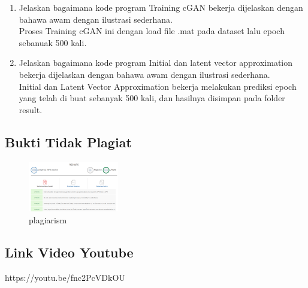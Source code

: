 \begin{enumerate}
	\item Jelaskan bagaimana kode program Training cGAN bekerja dijelaskan dengan bahawa awam dengan ilustrasi sederhana.
	\hfill\\
	Proses Training cGAN ini dengan load file .mat pada dataset lalu epoch sebanuak 500 kali.
		

	\item Jelaskan bagaimana kode program Initial dan latent vector approximation bekerja dijelaskan dengan bahawa awam dengan ilustrasi sederhana.
	\hfill\\
	Initial dan Latent Vector Approximation bekerja melakukan prediksi epoch yang telah di buat sebanyak 500 kali, dan hasilnya disimpan pada folder result.
		
		
\end{enumerate}


\subsection{Bukti Tidak Plagiat}
\begin{figure}[H]
	\includegraphics[width=4cm]{figures/1174084/9/plagiarism.png}
	\centering
	\caption{plagiarism}
\end{figure}


\subsection{Link Video Youtube}
https://youtu.be/fnc2PcVDkOU


